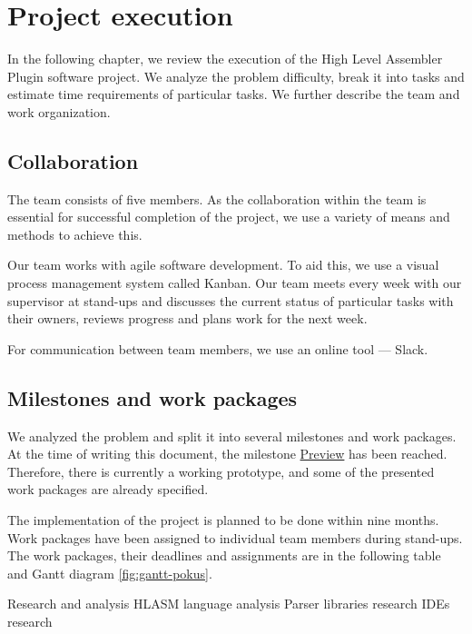 \chapter{Project execution}



In the following chapter, we review the execution of the High Level Assembler Plugin software project. 
We analyze the problem difficulty, break it into tasks and estimate time requirements of particular tasks.
We further describe the team and work organization.

\section{Collaboration}
The team consists of five members. As the collaboration within the team is essential for successful completion of the project, we use a variety of means and methods to achieve this. 

Our team works with agile software development. To aid this, we use a visual process management system called Kanban. Our team meets every week with our supervisor at stand-ups and discusses the current status of particular tasks with their owners, reviews progress and plans work for the next week.

For communication between team members, we use an online tool --- Slack.

\section{Milestones and work packages}
We analyzed the problem and split it into several milestones and work packages. At the time of writing this document,  the milestone \hyperref[milestone_preview]{Preview} has been reached. Therefore, there is currently a working prototype, and some of the presented work packages are already specified. 

The implementation of the project is planned to be done within nine months. Work packages have been assigned to individual team members during stand-ups. The work packages, their deadlines and assignments are in the following table and Gantt diagram \ref{fig:gantt-pokus}. 

\bms
	\itemm Research and analysis 
		\bwp
			\itemwp HLASM language analysis 
			\itemwp Parser libraries research 
			\itemwp IDEs research 
		\eenum
	
